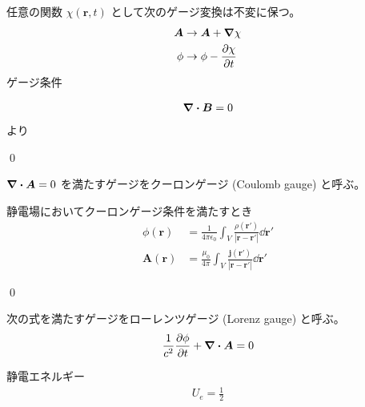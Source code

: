 \documentclass[uplatex,dvipdfmx,a4paper,11pt]{jlreq}
\makeatletter
\newcommand{\BB}{\bm{B}}
\renewcommand{\AA}{\bm{A}}
\newcommand{\rr}{\bm{r}}
\theoremstyle{definition}
\renewenvironment{proof}[1][\proofname]{\par
  \normalfont
  \topsep6\p@\@plus6\p@ \trivlist
  \item[\hskip\labelsep{\bfseries #1}\@addpunct{\bfseries}]\ignorespaces\quad\par
}{%
  \qed\endtrivlist\@endpefalse
}
\renewcommand\proofname{証明}
\makeatother
\begin{document}
\begin{theorem}[ゲージ変換]
  任意の関数 $\chi(\rr, t)$ として次のゲージ変換は不変に保つ。
  \begin{align}
    \AA  & \to \AA + \vnabla\chi    \\
    \phi & \to \phi - \pdv{\chi}{t}
  \end{align}
  ゲージ条件
\end{theorem}
\begin{proof}
  \begin{align}
    \vnabla\vdot\BB = 0
  \end{align}
  より

\end{proof}

\begin{definition}
  $\vnabla\vdot\AA = 0$ を満たすゲージをクーロンゲージ (Coulomb gauge) と呼ぶ。
\end{definition}

\begin{proposition}
  静電場においてクーロンゲージ条件を満たすとき
  \begin{align}
    \phi(\rr) & = \frac{1}{4\pi\epsilon_0}\int_V\frac{\rho(\rr')}{|\rr - \rr'|}\dd{\rr'} \\
    \AA(\rr)  & = \frac{\mu_0}{4\pi}\int_V\frac{\bm{j}(\rr')}{|\rr - \rr'|}\dd{\rr'}
  \end{align}
\end{proposition}
\begin{proof}

\end{proof}

\begin{definition}
  次の式を満たすゲージをローレンツゲージ (Lorenz gauge) と呼ぶ。
  \begin{align}
    \frac{1}{c^2}\pdv{\phi}{t} + \vnabla\vdot\AA = 0
  \end{align}
\end{definition}



\begin{theorem}
  静電エネルギー
  \begin{align}
    U_e = \frac{1}{2}
  \end{align}
\end{theorem}

\newcommand{\Et}{\tilde{E}}
\newcommand{\ET}{\tilde{\bm{E}}}
\newcommand{\Ec}{\mathcal{E}}
\newcommand{\EC}{\vb*{\mathcal{E}}}
\newcommand{\LL}{\bm{L}}
\newcommand{\ee}{\bm{\epsilon}}
\renewcommand{\SS}{\bm{S}}
\newcommand{\JJ}{\bm{J}}
\newcommand{\ii}{i}
\end{document}
